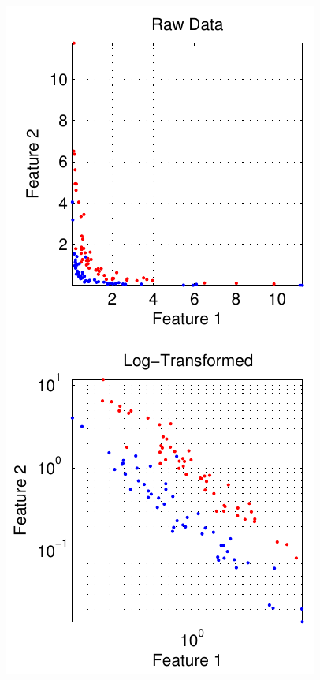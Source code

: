 \begin{frame}
\begin{columns}[c]
\includegraphics[width=\textwidth]{log_transformed}
\end{columns}
\end{frame}

